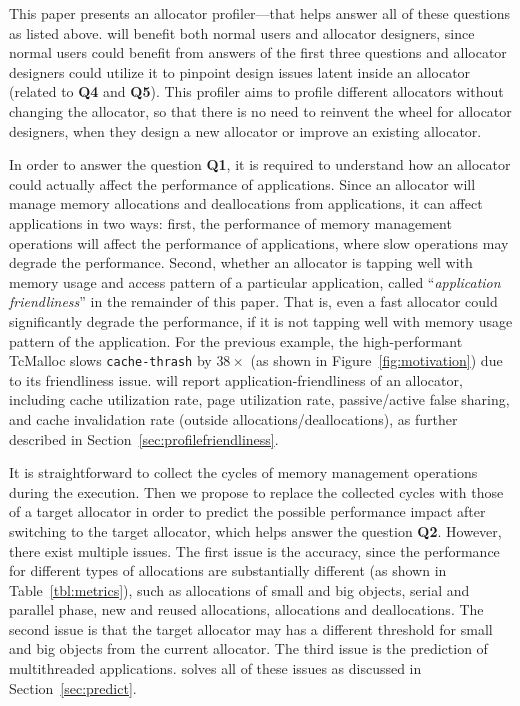 This paper presents an allocator profiler--\MP{}--that helps answer all of these questions as listed above. \MP{} will benefit both normal users and allocator designers, since normal users could benefit from answers of the first three questions and allocator designers could utilize it to pinpoint design issues latent inside an allocator (related to \textbf{Q4} and \textbf{Q5}). This profiler  aims to profile different allocators without changing the allocator, so that there is no need to reinvent the wheel for allocator designers, when they design a new allocator or improve an existing allocator. 

In order to answer the question \textbf{Q1}, it is required to understand how an allocator could actually affect the performance of applications. Since an allocator will manage memory allocations and deallocations from applications, it can affect applications in two ways: first, the performance of memory management operations will affect the performance of applications, where slow operations may degrade the performance.  Second, whether an allocator is tapping well with memory usage and access pattern of a particular application, called ``\textit{application friendliness}'' in the remainder of this paper. That is, even a fast allocator could significantly degrade the performance, if it is not tapping well with memory usage pattern of the application. For the previous example, the   high-performant TcMalloc slows \texttt{cache-thrash} by $38\times$ (as shown in Figure~\ref{fig:motivation}) due to its friendliness issue. \MP{} will report application-friendliness of an allocator, including cache utilization rate, page utilization rate, passive/active false sharing, and cache invalidation rate (outside allocations/deallocations), as further described in Section~\ref{sec:profilefriendliness}. 


It is straightforward to collect the cycles of memory management operations during the execution. Then we propose to replace the collected cycles with those of a target allocator in order to predict the possible performance impact after switching to the target allocator, which helps answer the question \textbf{Q2}. However, there exist multiple issues. The first issue is the accuracy, since the performance for different types of allocations are substantially different (as shown in Table~\ref{tbl:metrics}), such as allocations of small and big objects, serial and parallel phase, new and reused allocations, allocations and deallocations. The second issue is that the target allocator may has a different threshold for small and big objects from the current allocator. The third issue is the prediction of multithreaded applications. \MP{} solves all of these issues as discussed in Section~\ref{sec:predict}.

